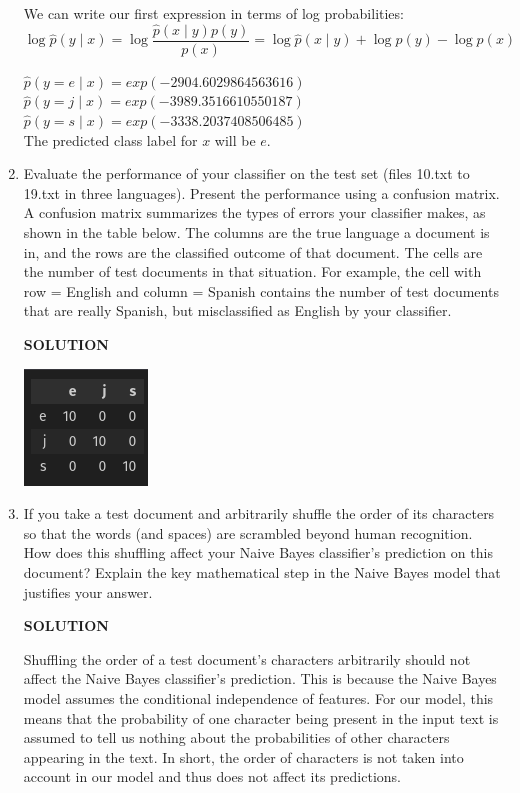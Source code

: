 \documentclass[a4paper]{article}
\theoremstyle{definition}
\begin{document}
\begin{enumerate}
We can write our first expression in terms of log probabilities:
$$\log{\hat p(y \mid x)} = \log{ \frac{\hat p(x \mid y) p(y)}{p(x)} } = \log{\hat p(x \mid y)} + \log{p(y) - \log{p(x)}}$$

$\hat p(y=e \mid x) = exp(-2904.6029864563616)$\\
$\hat p(y=j \mid x) = exp(-3989.3516610550187)$\\
$\hat p(y=s \mid x) = exp(-3338.2037408506485)$\\

The predicted class label for $x$ will be $e$.

\item
Evaluate the performance of your classifier on the test set (files 10.txt to 19.txt in three languages).
Present the performance using a confusion matrix. A confusion matrix summarizes the types of errors your classifier makes, as shown in the table below.   The columns are the true language a document is in, and the rows are the classified outcome of that document.  The cells are the number of test documents in that situation.  For example, the cell with row = English and column = Spanish contains the number of test documents that are really Spanish, but misclassified as English by your classifier.

\textbf{SOLUTION}

\includegraphics[width=0.2\linewidth]{3_7.png}

\item If you take a test document and arbitrarily shuffle the order of its characters so that the words (and spaces) are scrambled beyond human recognition.  How does this shuffling affect your Naive Bayes classifier's prediction on this document?  Explain the key mathematical step in the Naive Bayes model that justifies your answer.

\textbf{SOLUTION}

Shuffling the order of a test document's characters arbitrarily should not affect the Naive Bayes classifier's prediction. This is because the Naive Bayes model assumes the conditional independence of features. For our model, this means that the probability of one character being present in the input text is assumed to tell us nothing about the probabilities of other characters appearing in the text. In short, the order of characters is not taken into account in our model and thus does not affect its predictions.

\end{enumerate}
\end{document}
